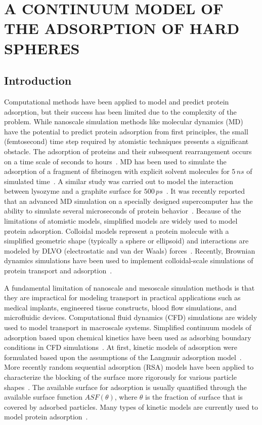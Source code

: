 
\chapter{A CONTINUUM MODEL OF THE ADSORPTION OF HARD SPHERES}


\section{Introduction}

Computational methods have been applied to model and predict protein
adsorption, but their success has been limited due to the complexity
of the problem. While nanoscale simulation methods like molecular
dynamics (MD) have the potential to predict protein adsorption from
first principles, the small (femtosecond) time step required by atomistic
techniques presents a significant obstacle. The adsorption of proteins
and their subsequent rearrangement occurs on a time scale of seconds
to hours~\cite{Latour2005}. MD has been used to simulate the adsorption
of a fragment of fibrinogen with explicit solvent molecules for $5\, ns$
of simulated time~\cite{Agashe2005}. A similar study was carried
out to model the interaction between lysozyme and a graphite surface
for $500\, ps$~\cite{Raffaini2010}. It was recently reported that
an advanced MD simulation on a specially designed supercomputer has
the ability to simulate several microseconds of protein behavior~\cite{Dror2010}.
Because of the limitations of atomistic models, simplified models
are widely used to model protein adsorption. Colloidal models represent
a protein molecule with a simplified geometric shape (typically a
sphere or ellipsoid) and interactions are modeled by DLVO (electrostatic
and van der Waals) forces~\cite{evans1994colloidal,Roth1993,Lenhoff1995}.
Recently, Brownian dynamics simulations have been used to implement
colloidal-scale simulations of protein transport and adsorption~\cite{Unni2005,Magan2006,Quinn2008}. 

A fundamental limitation of nanoscale and mesoscale simulation methods
is that they are impractical for modeling transport in practical applications
such as medical implants, engineered tissue constructs, blood flow
simulations, and microfluidic devices. Computational fluid dynamics
(CFD) simulations are widely used to model transport in macroscale
systems. Simplified continuum models of adsorption based upon chemical
kinetics have been used as adsorbing boundary conditions in CFD simulations~\cite{Jenkins2004,Glaser1993,Edwards1999}.
At first, kinetic models of adsorption were formulated based upon
the assumptions of the Langmuir adsorption model~\cite{Andrade1986}.
More recently random sequential adsorption (RSA) models have been
applied to characterize the blocking of the surface more rigorously
for various particle shapes~\cite{Talbot2000287}. The available
surface for adsorption is usually quantified through the available
surface function $ASF\left(\theta\right)$, where $\theta$ is the
fraction of surface that is covered by adsorbed particles. Many types
of kinetic models are currently used to model protein adsorption~\cite{Rabe2010}. 

